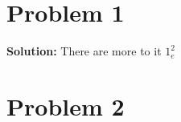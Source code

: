 \documentclass[a4paper]{article}
\begin{document}
\tableofcontents
\clearpage
\section{Problem 1}
\textbf{Solution:} There are more to it $1_e^2$
\clearpage
\section{Problem 2} 
\end{document}
